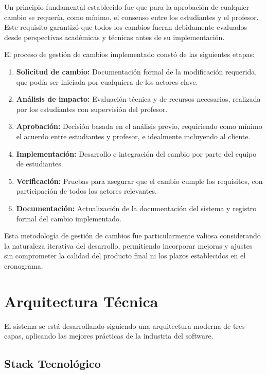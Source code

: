 Un principio fundamental establecido fue que para la aprobación de cualquier cambio se requería, como mínimo, el consenso entre los estudiantes y el profesor. Este requisito garantizó que todos los cambios fueran debidamente evaluados desde perspectivas académicas y técnicas antes de su implementación.

El proceso de gestión de cambios implementado constó de las siguientes etapas:

\begin{enumerate}
    \item \textbf{Solicitud de cambio:} Documentación formal de la modificación requerida, que podía ser iniciada por cualquiera de los actores clave.
    \item \textbf{Análisis de impacto:} Evaluación técnica y de recursos necesarios, realizada por los estudiantes con supervisión del profesor.
    \item \textbf{Aprobación:} Decisión basada en el análisis previo, requiriendo como mínimo el acuerdo entre estudiantes y profesor, e idealmente incluyendo al cliente.
    \item \textbf{Implementación:} Desarrollo e integración del cambio por parte del equipo de estudiantes.
    \item \textbf{Verificación:} Pruebas para asegurar que el cambio cumple los requisitos, con participación de todos los actores relevantes.
    \item \textbf{Documentación:} Actualización de la documentación del sistema y registro formal del cambio implementado.
\end{enumerate}

Esta metodología de gestión de cambios fue particularmente valiosa considerando la naturaleza iterativa del desarrollo, permitiendo incorporar mejoras y ajustes sin comprometer la calidad del producto final ni los plazos establecidos en el cronograma.

\section{Arquitectura Técnica}

El sistema se está desarrollando siguiendo una arquitectura moderna de tres capas, aplicando las mejores prácticas de la industria del software.

\subsection{Stack Tecnológico}

